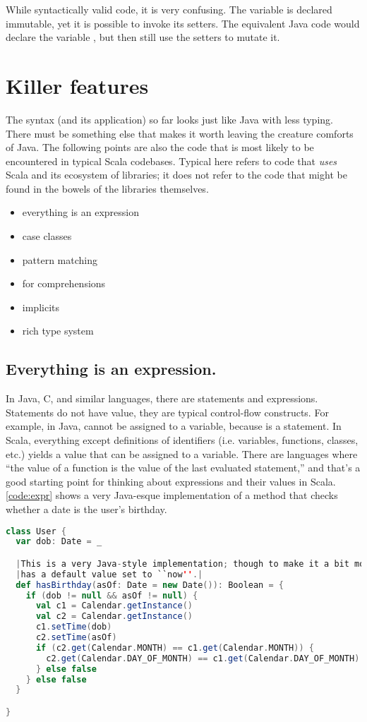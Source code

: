 \documentclass[10 pt]{article}
\begin{document}
While syntactically valid code, it is very confusing. The  variable is declared immutable, yet it is possible to invoke its setters. The equivalent Java code would declare the  variable , but then still use the setters to mutate it.

\section{Killer features}
The syntax (and its application) so far looks just like Java with less typing. There must be something else that makes it worth leaving the creature comforts of Java. The following points are also the code that is most likely to be encountered in typical Scala codebases. Typical here refers to code that \emph{uses} Scala and its ecosystem of libraries; it does not refer to the code that might be found in the bowels of the libraries themselves.

\begin{itemize}
  \item everything is an expression
  \item case classes
  \item pattern matching
  \item for comprehensions
  \item implicits
  \item rich type system
\end{itemize}

\subsection{Everything is an expression.} 
In Java, C, and similar languages, there are statements and expressions. Statements do not have value, they are typical control-flow constructs. For example, in Java,  cannot be assigned to a variable, because  is a statement. In Scala, everything except definitions of identifiers (i.e. variables, functions, classes, etc.) yields a value that can be assigned to a variable. There are languages where ``the value of a function is the value of the last evaluated statement,'' and that's a good starting point for thinking about expressions and their values in Scala. \autoref{code:expr} shows a very Java-esque implementation of a method that checks whether a date is the user's birthday. 

\begin{lstlisting}[caption={Expressions}, label={code:expr}, language=Scala, escapechar=|]
class User {
  var dob: Date = _

  |This is a very Java-style implementation; though to make it a bit more interesting, the |asOf| parameter|
  |has a default value set to ``now''.|
  def hasBirthday(asOf: Date = new Date()): Boolean = {
    if (dob != null && asOf != null) {
      val c1 = Calendar.getInstance()
      val c2 = Calendar.getInstance()
      c1.setTime(dob)
      c2.setTime(asOf)
      if (c2.get(Calendar.MONTH) == c1.get(Calendar.MONTH)) {
        c2.get(Calendar.DAY_OF_MONTH) == c1.get(Calendar.DAY_OF_MONTH)
      } else false
    } else false
  }

}
\end{lstlisting}
\end{document}
